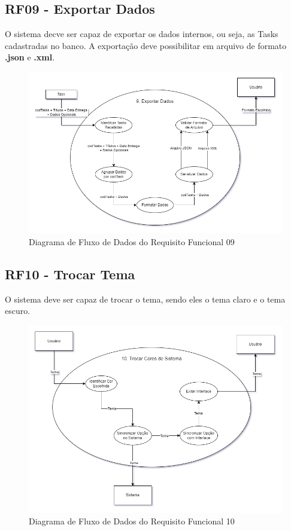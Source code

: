 \documentclass[a4paper,12pt]{article}
\begin{document}
\pagebreak
\subsection{RF09 - Exportar Dados}
O sistema decve ser capaz de exportar os dados internos, ou seja, as Tasks cadastradas no banco. A exportação deve possibilitar 
em arquivo de formato \textbf{.json} e \textbf{.xml}.
\begin{figure}[H]
	\centering
	\includegraphics[scale=0.45]{DFDs/RF09.drawio.png}
	\caption{Diagrama de Fluxo de Dados do Requisito Funcional 09}
\end{figure}

\pagebreak
\subsection{RF10 - Trocar Tema}
O sistema deve ser capaz de trocar o tema, sendo eles o tema claro e o tema escuro.
\begin{figure}[H]
	\centering
	\includegraphics[scale=0.45]{DFDs/RF10.drawio.png}
	\caption{Diagrama de Fluxo de Dados do Requisito Funcional 10}
\end{figure}
\end{document}
